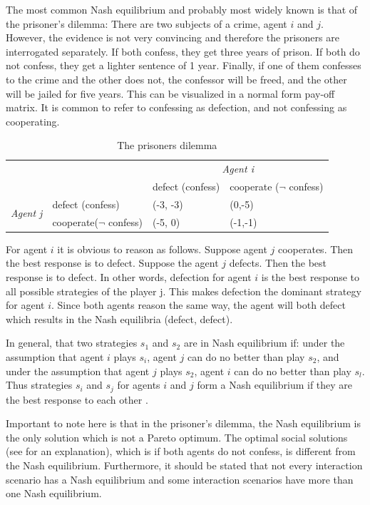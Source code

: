 The most common Nash equilibrium and probably most widely known is that of the prisoner's dilemma:
There are two subjects of a crime, agent $i$ and $j$. However, the evidence is not very convincing and therefore the prisoners are interrogated separately. If both confess, they get three years of prison. If both do not confess, they get a lighter sentence of 1 year. Finally, if one of them confesses to the crime and the other does not, the confessor will be freed, and the other will be jailed for five years.
This can be visualized in a normal form pay-off matrix. It is common to refer to confessing as defection, and not confessing as cooperating.
\begin{table}[h]
\begin{tabular}{llll}
	\toprule 
		&  				& \multicolumn{2}{c}{\textit{Agent i}}\\ 
		\cmidrule{3-4}
	 	&				& defect (confess) 	& cooperate ($\neg$ confess) \\ 
	 	\cmidrule{3-4}
	\multirow{2}{*}{\textit{Agent j}}	& defect (confess)	&  	(-3, -3)			& (0,-5) \\ 
		& cooperate($\neg $ confess) 	&  (-5, 0)				& (-1,-1) \\ 
	\bottomrule
\end{tabular} \label{tab:nashprison} \caption{The prisoners dilemma}
\end{table}
For agent $i$ it is obvious to reason as follows. Suppose agent $j$ cooperates. Then the best response is to defect. Suppose the agent $j$ defects. Then the best response is to defect. In other words, defection for agent $i$ is the best response to all possible strategies of the player j. This makes defection the dominant strategy for agent $i$. Since both agents reason the same way, the agent will both defect which results in the Nash equilibria (defect, defect).

In general, that two strategies $s_1$ and $s_2$ are in Nash equilibrium if: under the assumption that agent $i$ plays $s_i$, agent $j$ can do no better than play $s_2$, and under the assumption that agent $j$ plays $s_2$, agent $i$ can do no better than play $s_l$. Thus strategies $s_i$ and $s_j$ for agents $i$ and $j$ form a Nash equilibrium if they are the best response to each other  \citep{wooldridge2009introduction}. 

Important to note here is that in the prisoner's dilemma, the Nash equilibrium is the only solution which is not a Pareto optimum.  The optimal social solutions (see  for an explanation), which is if both agents do not confess, is different from the Nash equilibrium.  Furthermore, it should be stated that not every interaction scenario has a Nash equilibrium and some interaction scenarios have more than one Nash equilibrium. 

